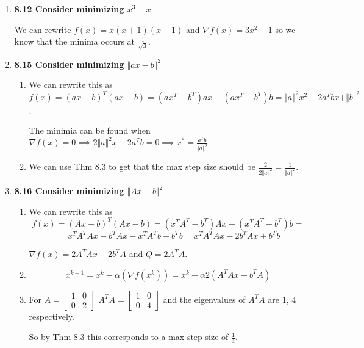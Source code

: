 \documentclass[10pt,a4paper]{article}
\begin{document}
\begin{enumerate}
\begin{enumerate}
    \end{enumerate}

    \item \textbf{8.12 Consider minimizing $x^3 - x$}
   
    We can rewrite $f(x) = x(x+1)(x-1)$ and $\nabla f(x) = 3x^2 -1 $ so we know that the minima occurs at $\frac{1}{\sqrt 3}$.

    \item \textbf{8.15 Consider minimizing  $\Vert ax-b \Vert^2$}
    \begin{enumerate}
        \item We can rewrite this as $f(x) = (ax-b)^T(ax-b) = (ax^T-b^T)ax - (ax^T-b^T)b = \Vert a \Vert^2 x^2 - 2a^Tb x + \Vert b \Vert^2$. 
        
        The minimia can be found when $\nabla f(x) = 0 \implies 2 \Vert a \Vert^2 x - 2 a^Tb= 0 \implies x^* = \frac{a^Tb}{\Vert a \Vert^2}$

        \item We can use Thm 8.3 to get that the max step size should be $\frac{2}{2 \Vert a \Vert^2}  = \frac{1}{\Vert a \Vert^2}$.
    \end{enumerate}

    \item \textbf{8.16 Consider minimizing  $\Vert Ax-b \Vert^2$}
    \begin{enumerate}
        \item We can rewrite this as $$f(x) = (Ax-b)^T(Ax-b) = (x^TA^T-b^T)Ax - (x^TA^T-b^T)b = $$
        $$= x^TA^TAx -b^TAx - x^TA^Tb +b^Tb  = x^TA^TAx -2b^TA x +b^Tb  $$

        $\nabla f(x) = 2A^TAx - 2b^TA$ and $Q = 2A^TA$.

        \item $$x^{k+1} = x^k - \alpha (\nabla f(x^k)) = x^k - \alpha 2 (A^TAx - b^TA)  $$
        
        \item For $A = \begin{bmatrix} 1 & 0 \\ 0 & 2 \end{bmatrix}$ $A^TA = \begin{bmatrix} 1 & 0  \\ 0 & 4\end{bmatrix}$ and the eigenvalues of $A^TA$  are 1, 4 respectively. 
        
        So by Thm 8.3 this corresponds to a max step size of $\frac{1}{4}$.
        
    \end{enumerate}
   

\end{enumerate}
\end{document}
